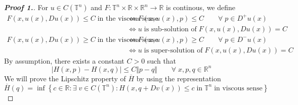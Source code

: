 \documentclass[12pt, oneside]{amsart}  	%
\begin{document}
\begin{proof}[\textbf{Proof 1.}] For $u\in C(\mathbb{T}^n)$ and $F:\mathbb{T}^n\times \mathbb{R}\times \mathbb{R}^n\longrightarrow \mathbb{R}$ is continous, we define
\begin{align*}
F(x,u(x),Du(x)) \leq C\;\text{in the viscous sense}\; &\Longleftrightarrow F(x,u(x),p) \leq C \qquad\forall\; p\in D^+u(x)\\
&\Longleftrightarrow u\;\text{is sub-solution of}\; F(x,u(x),Du(x)) = C\\
F(x,u(x),Du(x)) \geq C\;\text{in the viscous sense}\; &\Longleftrightarrow F(x,u(x),p) \geq C \qquad\forall\; p\in D^-u(x)\\
&\Longleftrightarrow u\;\text{is super-solution of}\; F(x,u(x),Du(x)) = C
\end{align*}
By assumption, there exists a constant $C>0$ such that
\begin{equation*}
|H(x,p) - H(x,q)|\leq C\Vert p-q\Vert\qquad\forall\;x,p,q\in \mathbb{R}^n
\end{equation*}
We will prove the Lipschitz property of $\overline{H}$ by using the representation 
\begin{equation}\label{nonconvex - representation of effective H}
\overline{H}(q) = \inf \left\lbrace c\in \mathbb{R}: \exists\;v\in C(\mathbb{T}^n): H(x,q+Dv(x))\leq c\;\text{in}\;\mathbb{T}^n\;\text{in viscous sense}\right\rbrace 
\end{equation}
\vspace*{0.2cm}

\end{proof}
\end{document}
